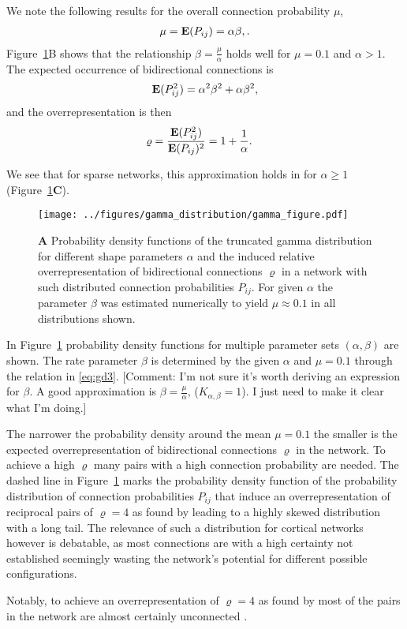 We note the following results for the overall connection probability
$\mu$,
%
\begin{align}
 \mu = \operatorname{\mathbf{E}}(P_{ij}) = \alpha \beta, \label{eq:gd3}.
\end{align}
Figure~\ref{fig:gd}B shows that the relationship $\beta =
\frac{\mu}{\alpha}$ holds well for $\mu = 0.1$ and $\alpha > 1$. The
expected occurrence of bidirectional connections is
\begin{align}
  \operatorname{\mathbf{E}}(P_{ij}^2) = \alpha^2 \beta^2 + \alpha \beta^2,
\end{align}
%
and the overrepresentation is then
\begin{align}
  \varrho & = \frac{\E(P_{ij}^2)}{\E(P_{ij})^2} =%
 1 + \frac{1}{\alpha}.
\end{align}

We see that for sparse networks, this approximation holds in for $\alpha \geq 1$ (Figure~\ref{fig:gd}\textbf{C}).

\begin{figure}[h!]
\centering
\texttt{[image: ../figures/gamma\_distribution/gamma\_figure.pdf]}
\caption{\textbf{A} Probability density functions of the truncated
  gamma distribution for different shape parameters $\alpha$ and the
  induced relative overrepresentation of bidirectional connections
  $\varrho$ in a network with such distributed connection
  probabilities $P_{ij}$. For given $\alpha$ the parameter $\beta$ was
  estimated numerically to yield $\mu \approx 0.1$ in all
  distributions shown.}
\label{fig:gd}
\end{figure}

In Figure~\ref{fig:gd} probability density functions for multiple
parameter sets $(\alpha, \beta)$ are shown. The rate parameter $\beta$
is determined by the given $\alpha$ and $\mu = 0.1$ through the
relation in \eqref{eq:gd3}. [Comment: I'm not sure it's worth deriving
  an expression for $\beta$. A good approximation is $\beta =
  \frac{\mu}{\alpha}$, ($K_{\alpha,\beta} = 1$). I just need to make
  it clear what I'm doing.]

The narrower the probability density around the mean $\mu = 0.1$ the
smaller is the expected overrepresentation of bidirectional
connections $\varrho$ in the network. To achieve a high $\varrho$ many
pairs with a high connection probability are needed. The dashed line
in Figure~\ref{fig:gd} marks the probability density function of the
probability distribution of connection probabilities $P_{ij}$ that
induce an overrepresentation of reciprocal pairs of $\varrho = 4$ as
found by \textcite{Song2005} leading to a highly skewed distribution
with a long tail. The relevance of such a distribution for cortical
networks however is debatable, as most connections are with a high
certainty not established seemingly wasting the network's potential
for different possible configurations.


Notably, to achieve an overrepresentation of $\varrho = 4$ as found by
\textcite{Song2005} most of the pairs in the network are almost
certainly unconnected .



